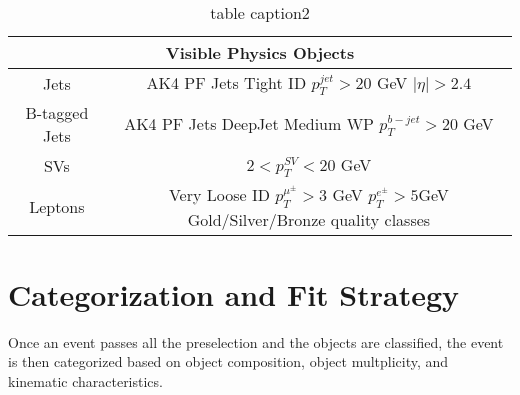 \begin{table}
\centering
\label{tab:physicsobjects}
\caption{table caption2}
\begin{tabular}{c|c}
\hline 
\multicolumn{2}{c}{Visible Physics Objects} \\ 
\hline 
\hline
Jets & \makecell{AK4 PF Jets \\ Tight ID \\ $p_T^{jet} > 20$ GeV \\ $|\eta|>2.4$} \\ 
\hline
B-tagged Jets & \makecell{AK4 PF Jets \\ DeepJet Medium WP \\ $p_T^{b-jet} > 20 $ GeV}  \\ 
\hline
SVs & $2<p_T^{SV}<20$ GeV \\ 
\hline
Leptons & \makecell{Very Loose ID \\ $p_T^{\mu^\pm} > 3$ GeV \\ $p_T^{e^\pm} > 5 $GeV \\ Gold/Silver/Bronze quality classes} \\ 
\hline 
\end{tabular} 
\end{table}

\section{Categorization and Fit Strategy}

Once an event passes all the preselection and the objects are classified, the event is then categorized based on object composition, object multplicity, and kinematic characteristics. 

